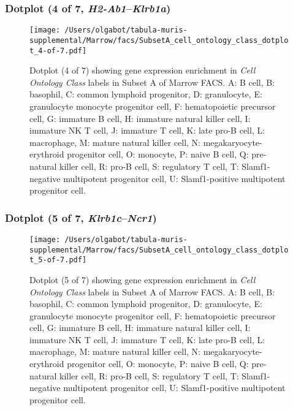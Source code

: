 \subsubsection{Dotplot (4 of 7, \emph{H2-Ab1}--\emph{Klrb1a})}
\begin{figure}[h]
\centering
\texttt{[image: /Users/olgabot/tabula-muris-supplemental/Marrow/facs/SubsetA\_cell\_ontology\_class\_dotplot\_4-of-7.pdf]}

\caption{ Dotplot (4 of 7)  showing gene expression enrichment in \emph{Cell Ontology Class} labels in Subset A of Marrow FACS. A: B cell, B: basophil, C: common lymphoid progenitor, D: granulocyte, E: granulocyte monocyte progenitor cell, F: hematopoietic precursor cell, G: immature B cell, H: immature natural killer cell, I: immature NK T cell, J: immature T cell, K: late pro-B cell, L: macrophage, M: mature natural killer cell, N: megakaryocyte-erythroid progenitor cell, O: monocyte, P: naive B cell, Q: pre-natural killer cell, R: pro-B cell, S: regulatory T cell, T: Slamf1-negative multipotent progenitor cell, U: Slamf1-positive multipotent progenitor cell.}
\end{figure}


\clearpage

\subsubsection{Dotplot (5 of 7, \emph{Klrb1c}--\emph{Ncr1})}
\begin{figure}[h]
\centering
\texttt{[image: /Users/olgabot/tabula-muris-supplemental/Marrow/facs/SubsetA\_cell\_ontology\_class\_dotplot\_5-of-7.pdf]}

\caption{ Dotplot (5 of 7)  showing gene expression enrichment in \emph{Cell Ontology Class} labels in Subset A of Marrow FACS. A: B cell, B: basophil, C: common lymphoid progenitor, D: granulocyte, E: granulocyte monocyte progenitor cell, F: hematopoietic precursor cell, G: immature B cell, H: immature natural killer cell, I: immature NK T cell, J: immature T cell, K: late pro-B cell, L: macrophage, M: mature natural killer cell, N: megakaryocyte-erythroid progenitor cell, O: monocyte, P: naive B cell, Q: pre-natural killer cell, R: pro-B cell, S: regulatory T cell, T: Slamf1-negative multipotent progenitor cell, U: Slamf1-positive multipotent progenitor cell.}
\end{figure}


\clearpage

